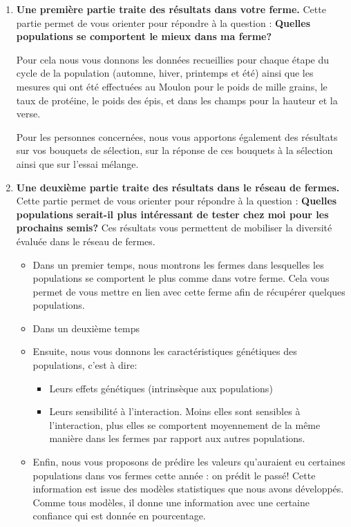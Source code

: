 \begin{enumerate}

\item \textbf{Une première partie traite des résultats dans votre ferme.} Cette partie permet de vous orienter pour répondre à la question : \textbf{Quelles populations se comportent le mieux dans ma ferme?}

Pour cela nous vous donnons les données recueillies pour chaque étape du cycle de la population (automne, hiver, printemps et été) ainsi que les mesures qui ont été effectuées au Moulon pour le poids de mille grains, le taux de protéine, le poids des épis, et dans les champs pour la hauteur et la verse.

Pour les personnes concernées, nous vous apportons également des résultats sur vos bouquets de sélection, sur la réponse de ces bouquets à la sélection ainsi que sur l'essai mélange.

\item \textbf{Une deuxième partie traite des résultats dans le réseau de fermes.} Cette partie permet de vous orienter pour répondre à la question : \textbf{Quelles populations serait-il plus intéressant de tester chez moi pour les prochains semis?} Ces résultats vous permettent de mobiliser la diversité évaluée dans le réseau de fermes.

\begin{itemize}
\item Dans un premier temps, nous montrons les fermes dans lesquelles les populations se comportent le plus comme dans  votre ferme. Cela vous permet de vous mettre en lien avec cette ferme afin de récupérer quelques populations.

\item Dans un deuxième temps 

\item Ensuite, nous vous donnons les caractéristiques génétiques des populations, c'est à dire:
\begin{itemize}
\item Leurs effets génétiques (intrinsèque aux populations)
\item Leurs sensibilité à l'interaction. Moins elles sont sensibles à l'interaction, plus elles se comportent moyennement de la même manière dans les fermes par rapport aux autres populations.
\end{itemize}

\item Enfin, nous vous proposons de prédire les valeurs qu'auraient eu certaines populations dans vos fermes cette année : on prédit le passé!
Cette information est issue des modèles statistiques que nous avons développés.
Comme tous modèles, il donne une information avec une certaine confiance qui est donnée en pourcentage.
\end{itemize}

\end{enumerate}

